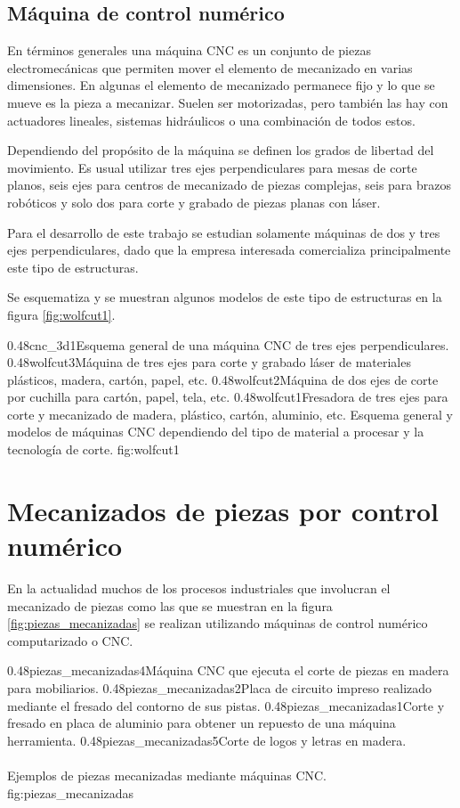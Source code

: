\subsection{Máquina de control numérico}
En términos generales una máquina CNC es un conjunto de piezas electromecánicas que permiten mover el elemento de mecanizado en varias dimensiones.
En algunas el elemento de mecanizado permanece fijo y lo que se mueve es la pieza a mecanizar.
Suelen ser motorizadas, pero también las hay con actuadores lineales, sistemas hidráulicos o una combinación de todos estos.\par
Dependiendo del propósito de la máquina se definen los grados de libertad del movimiento.
Es usual utilizar tres ejes perpendiculares para mesas de corte planos, seis ejes para centros de mecanizado de piezas complejas, seis para brazos robóticos y solo dos para corte y grabado de piezas planas con láser.\par
Para el desarrollo de este trabajo se estudian solamente máquinas de dos y tres ejes perpendiculares, dado que la empresa interesada comercializa principalmente este tipo de estructuras. \par
Se esquematiza y se muestran algunos modelos de este tipo de estructuras en la figura \ref{fig:wolfcut1}.


\subfigtwotwo
            {0.48}{cnc_3d1}{Esquema general de una máquina CNC de tres ejes perpendiculares.\\ \vphantom{1}}
            {0.48}{wolfcut3}{Máquina de tres ejes para corte y grabado láser de materiales plásticos, madera, cartón, papel, etc.}
            {0.48}{wolfcut2}{Máquina de dos ejes de corte por cuchilla para cartón, papel, tela, etc.}
            {0.48}{wolfcut1}{Fresadora de tres ejes para corte y mecanizado de madera, plástico, cartón, aluminio, etc.}
            {Esquema general y modelos de máquinas CNC dependiendo del tipo de material a procesar y la tecnología de corte.}
            {fig:wolfcut1}


\section{Mecanizados de piezas por control numérico}

En la actualidad muchos de los procesos industriales que involucran el mecanizado de piezas como las que se muestran en la figura \ref{fig:piezas_mecanizadas} se realizan utilizando máquinas de control numérico computarizado o CNC.

\subfigtwotwo 
         {0.48}{piezas_mecanizadas4}{Máquina CNC que ejecuta el corte de piezas en madera para mobiliarios.} 
         {0.48}{piezas_mecanizadas2}{Placa de circuito impreso realizado mediante el fresado del contorno de sus pistas.}
         {0.48}{piezas_mecanizadas1}{Corte y fresado en placa de aluminio para obtener un repuesto de una máquina herramienta.}
         {0.48}{piezas_mecanizadas5}{Corte de logos y letras en madera. \\ \vphantom{10}\\ \vphantom{10}}
         {Ejemplos de piezas mecanizadas mediante máquinas CNC.}
         {fig:piezas_mecanizadas}


